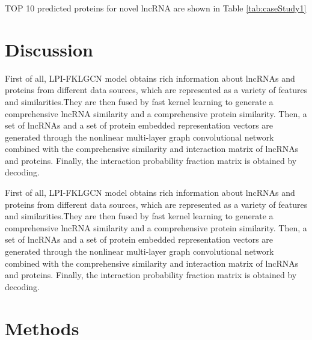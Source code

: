 \documentclass[fleqn,10pt]{wlscirep}
\begin{document}
TOP 10 predicted proteins for novel lncRNA are shown in Table \ref{tab:caseStudy1}

\section*{Discussion}
First of all, LPI-FKLGCN model obtains rich information about lncRNAs and proteins from different data sources, which are represented as a variety of features and similarities.They are then fused by fast kernel learning to generate a comprehensive lncRNA similarity and a comprehensive protein similarity. Then, a set of lncRNAs and a set of protein embedded representation vectors are generated through the nonlinear multi-layer graph convolutional network combined with the comprehensive similarity and interaction matrix of lncRNAs and proteins. Finally, the interaction probability fraction matrix is obtained by decoding.

First of all, LPI-FKLGCN model obtains rich information about lncRNAs and proteins from different data sources, which are represented as a variety of features and similarities.They are then fused by fast kernel learning to generate a comprehensive lncRNA similarity and a comprehensive protein similarity. Then, a set of lncRNAs and a set of protein embedded representation vectors are generated through the nonlinear multi-layer graph convolutional network combined with the comprehensive similarity and interaction matrix of lncRNAs and proteins. Finally, the interaction probability fraction matrix is obtained by decoding.

\section*{Methods}
\end{document}
